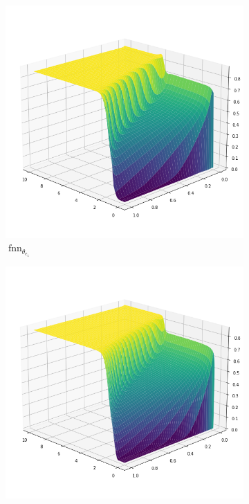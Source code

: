 \begin{figure}[H]
    \begin{center}
        \begin{subfigure}[b]{0.4\textwidth}
            \begin{center}
                \includegraphics[scale=0.35]{img/Kante1.png}
            \end{center}
            \caption{$\operatorname{fnn}_{\theta_{e_1}}$}
        \end{subfigure} \hspace{15mm}
        \begin{subfigure}[b]{0.4\textwidth}
            \begin{center}
                \includegraphics[scale=0.35]{img/FVM1.png}

\end{center}
\end{subfigure}
\end{center}
\end{figure}
